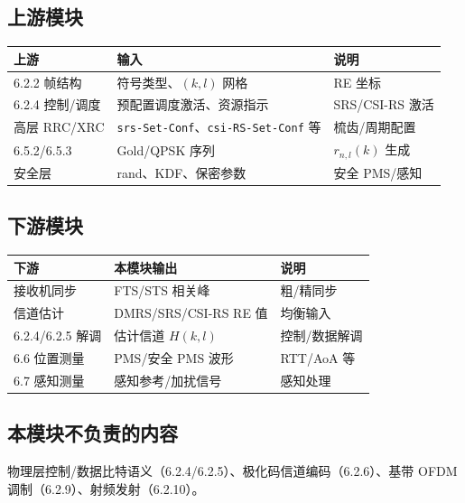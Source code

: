 \documentclass[11pt,a4paper]{ctexart}
\begin{document}
\subsection{上游模块}

\begin{table}[h]
\centering
\small
\begin{tabular}{p{4cm}p{4.5cm}p{5.5cm}}
\toprule
\textbf{上游} & \textbf{输入} & \textbf{说明} \\
\midrule
6.2.2 帧结构 & 符号类型、$(k,l)$ 网格 & RE 坐标 \\
6.2.4 控制/调度 & 预配置调度激活、资源指示 & SRS/CSI-RS 激活 \\
高层 RRC/XRC & \texttt{srs-Set-Conf}、\texttt{csi-RS-Set-Conf} 等 & 梳齿/周期配置 \\
6.5.2/6.5.3 & Gold/QPSK 序列 & $r_{n,l}(k)$ 生成 \\
安全层 & rand、KDF、保密参数 & 安全 PMS/感知 \\
\bottomrule
\end{tabular}
\end{table}

\subsection{下游模块}

\begin{table}[h]
\centering
\small
\begin{tabular}{p{4cm}p{4.5cm}p{5.5cm}}
\toprule
\textbf{下游} & \textbf{本模块输出} & \textbf{说明} \\
\midrule
接收机同步 & FTS/STS 相关峰 & 粗/精同步 \\
信道估计 & DMRS/SRS/CSI-RS RE 值 & 均衡输入 \\
6.2.4/6.2.5 解调 & 估计信道 $H(k,l)$ & 控制/数据解调 \\
6.6 位置测量 & PMS/安全 PMS 波形 & RTT/AoA 等 \\
6.7 感知测量 & 感知参考/加扰信号 & 感知处理 \\
\bottomrule
\end{tabular}
\end{table}

\subsection{本模块不负责的内容}

物理层控制/数据比特语义（6.2.4/6.2.5）、极化码信道编码（6.2.6）、基带 OFDM 调制（6.2.9）、射频发射（6.2.10）。
\end{document}
